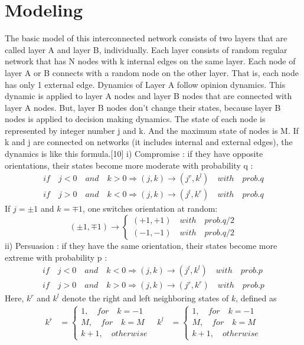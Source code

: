 \documentclass[english]{cccconf}
\begin{document}
\section{Modeling}

The basic model of this interconnected network consists of two layers that are called layer A and layer B, individually. Each layer consists of random regular network that has N nodes with k internal edges on the same layer. Each node of layer A or B   connects with a random node on the other layer. That is, each node has only 1 external edge. 
Dynamics of Layer A follow opinion dynamics. This dynamic is applied to layer A nodes and layer B nodes that are connected with layer A nodes. But, layer B nodes don’t change their states, because layer B nodes is applied to decision making dynamics. The state of each node is represented by integer number j and k. And the maximum state of nodes is M. If k and j are connected on networks (it includes internal and external edges), the dynamics is like this formula.[10]
i) Compromise : if they have opposite orientations, their states become more moderate with probability q :
\begin{align*}
  \label{eq1}
  if \quad j<0 \quad and \quad k>0  \Rightarrow (j, k) \rightarrow (j^r, k^l) \quad with\quad prob.q\\
  if \quad j>0 \quad and \quad k<0  \Rightarrow (j, k) \rightarrow (j^l, k^r) \quad with\quad prob.q
\end{align*}
If $j = \pm1$ and $k = \mp1$, one switches orientation at random:
\begin{equation*}
(\pm 1, \mp 1)\rightarrow \left\{\begin{matrix}
(+1, +1) \quad with \quad prob.q/2
\\(-1, -1)\quad with \quad prob.q/2 
\end{matrix}\right.
\end{equation*}
ii) Persuasion : if they have the same orientation, their states become more extreme with probability p :
\begin{align*}
 if \quad j<0 \quad and \quad k<0  \Rightarrow (j, k) \rightarrow (j^l, k^l) \quad with\quad prob.p\\
 if \quad j>0 \quad and \quad k>0  \Rightarrow (j, k) \rightarrow (j^r, k^r) \quad with\quad prob.p
\end{align*}
Here, $k^r$ and $k^l$ denote the right and left neighboring states of $k$, defined as
\begin{align}
k^r &= \left\{\begin{matrix}
1,\quad for\quad k= -1 
\\ M,\quad for \quad k=M  
\\ k+1,\quad otherwise
\end{matrix}\right. &
k^l &= \left\{\begin{matrix}
1,\quad for\quad k= -1 
\\ M,\quad for \quad k=M  
\\ k+1,\quad otherwise
\end{matrix}\right. 
\end{align}
\end{document}
